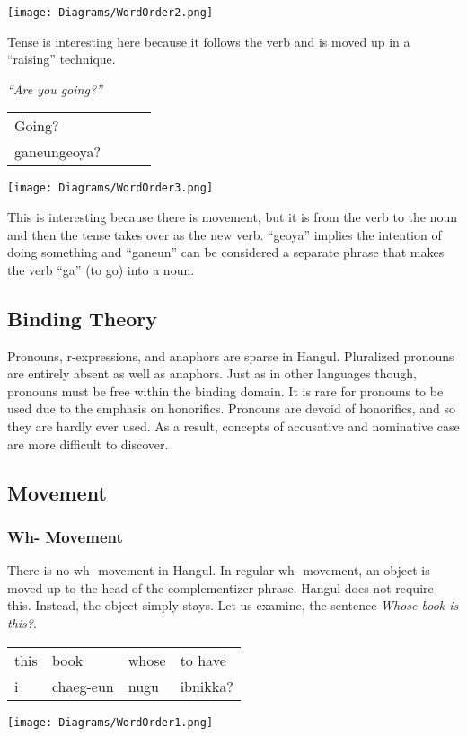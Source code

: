 \documentclass[11pt]{report}
\begin{document}
\texttt{[image: Diagrams/WordOrder2.png]}

Tense is interesting here because it follows the verb and is moved up
in a ``raising'' technique. 

\emph{``Are you going?''}

\begin{tabular}{llll}
Going? \\
ganeungeoya?
\end{tabular}

\texttt{[image: Diagrams/WordOrder3.png]}

This is interesting because there is movement, but it is from the
verb to the noun and then the tense takes over as the new
verb. ``geoya'' implies the intention of doing something and
``ganeun'' can be considered a separate phrase that makes the verb
``ga'' (to go) into a noun.


\subsection{Binding Theory}
Pronouns, r-expressions, and anaphors are sparse in Hangul. Pluralized
pronouns are entirely absent as well as anaphors. Just as in other
languages though, pronouns must be free within the binding domain. It
is rare for pronouns to be used due to the emphasis on
honorifics. Pronouns are devoid of honorifics, and so they are hardly
ever used. As a result, concepts of accusative and nominative case are
more difficult to discover.

\subsection{Movement}

\subsubsection{Wh- Movement}
There is no wh- movement in Hangul. In regular wh- movement, an object
is moved up to the head of the complementizer phrase. Hangul does not
require this. Instead, the object simply stays. Let us examine, the
sentence \emph{Whose book is this?}.

\begin{tabular}{llll}
this & book & whose & to have \\
i & chaeg-eun & nugu &ibnikka?
\end{tabular}

\texttt{[image: Diagrams/WordOrder1.png]}
\end{document}
